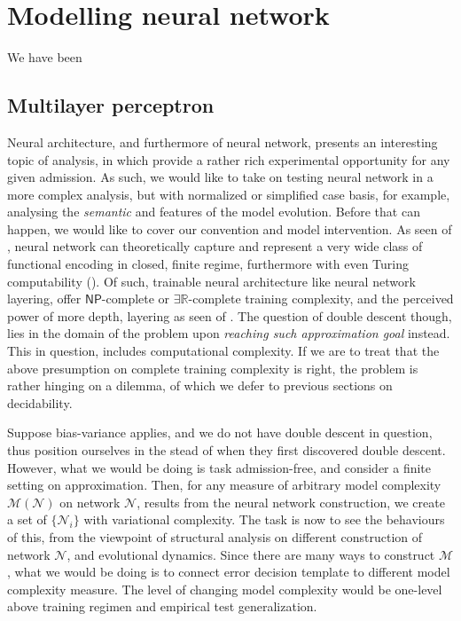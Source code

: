 \chapter{Modelling neural network}

We have been 

\section{Multilayer perceptron}
Neural architecture, and furthermore of neural network, presents an interesting topic of analysis, in which provide a rather rich experimental opportunity for any given admission. As such, we would like to take on testing neural network in a more complex analysis, but with normalized or simplified case basis, for example, analysing the \textit{semantic} and features of the model evolution. Before that can happen, we would like to cover our convention and model intervention. As seen of \cite{cybenko_1989,hornik_1991}, neural network can theoretically capture and represent a very wide class of functional encoding in closed, finite regime, furthermore with even Turing computability (\cite{siegelmann1991turing}). Of such, trainable neural architecture like neural network layering, offer $\mathsf{NP}$-complete or $\exists \mathbb{R}$-complete training complexity, and the perceived power of more depth, layering as seen of \cite{eldan2016power,telgarsky2016benefits}. The question of double descent though, lies in the domain of the problem upon \textit{reaching such approximation goal} instead. This in question, includes computational complexity. If we are to treat that the above presumption on complete training complexity is right, the problem is rather hinging on a dilemma, of which we defer to previous sections on decidability. 

Suppose bias-variance applies, and we do not have double descent in question, thus position ourselves in the stead of \cite{belkin_reconciling_2019} when they first discovered double descent. However, what we would be doing is task admission-free, and consider a finite setting on approximation. Then, for any measure of arbitrary model complexity $\mathcal{M}(\mathcal{N})$ on network $\mathcal{N}$, results from the neural network construction, we create a set of $\{\mathcal{N}_{i}\}$ with  variational complexity. The task is now to see the behaviours of this, from the viewpoint of structural analysis on different construction of network $\mathcal{N}$, and evolutional dynamics. Since there are many ways to construct $\mathcal{M}$, what we would be doing is to connect error decision template to different model complexity measure. The level of changing model complexity would be one-level above training regimen and empirical test generalization. 

